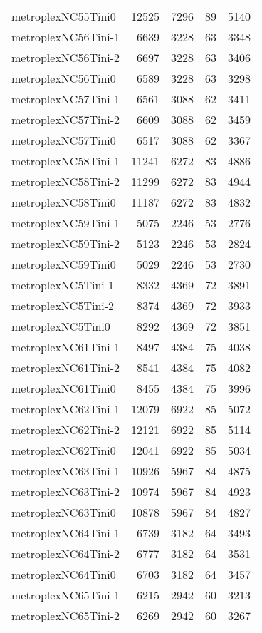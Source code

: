 \documentclass[../../../thesis.tex]{subfiles}
\begin{document}
\begin{longtable}{lrrrr}
metroplexNC55Tini0 & 12525 & 7296 & 89 & 5140 \\
metroplexNC56Tini-1 & 6639 & 3228 & 63 & 3348 \\
metroplexNC56Tini-2 & 6697 & 3228 & 63 & 3406 \\
metroplexNC56Tini0 & 6589 & 3228 & 63 & 3298 \\
metroplexNC57Tini-1 & 6561 & 3088 & 62 & 3411 \\
metroplexNC57Tini-2 & 6609 & 3088 & 62 & 3459 \\
metroplexNC57Tini0 & 6517 & 3088 & 62 & 3367 \\
metroplexNC58Tini-1 & 11241 & 6272 & 83 & 4886 \\
metroplexNC58Tini-2 & 11299 & 6272 & 83 & 4944 \\
metroplexNC58Tini0 & 11187 & 6272 & 83 & 4832 \\
metroplexNC59Tini-1 & 5075 & 2246 & 53 & 2776 \\
metroplexNC59Tini-2 & 5123 & 2246 & 53 & 2824 \\
metroplexNC59Tini0 & 5029 & 2246 & 53 & 2730 \\
metroplexNC5Tini-1 & 8332 & 4369 & 72 & 3891 \\
metroplexNC5Tini-2 & 8374 & 4369 & 72 & 3933 \\
metroplexNC5Tini0 & 8292 & 4369 & 72 & 3851 \\
metroplexNC61Tini-1 & 8497 & 4384 & 75 & 4038 \\
metroplexNC61Tini-2 & 8541 & 4384 & 75 & 4082 \\
metroplexNC61Tini0 & 8455 & 4384 & 75 & 3996 \\
metroplexNC62Tini-1 & 12079 & 6922 & 85 & 5072 \\
metroplexNC62Tini-2 & 12121 & 6922 & 85 & 5114 \\
metroplexNC62Tini0 & 12041 & 6922 & 85 & 5034 \\
metroplexNC63Tini-1 & 10926 & 5967 & 84 & 4875 \\
metroplexNC63Tini-2 & 10974 & 5967 & 84 & 4923 \\
metroplexNC63Tini0 & 10878 & 5967 & 84 & 4827 \\
metroplexNC64Tini-1 & 6739 & 3182 & 64 & 3493 \\
metroplexNC64Tini-2 & 6777 & 3182 & 64 & 3531 \\
metroplexNC64Tini0 & 6703 & 3182 & 64 & 3457 \\
metroplexNC65Tini-1 & 6215 & 2942 & 60 & 3213 \\
metroplexNC65Tini-2 & 6269 & 2942 & 60 & 3267 \\

\end{longtable}
\end{document}
